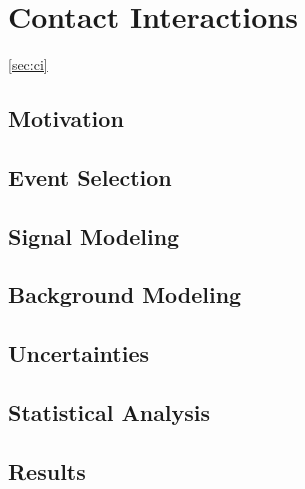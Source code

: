 \chapter{Contact Interactions}\ref{sec:ci}

\section{Motivation}
\section{Event Selection}
\section{Signal Modeling}
\section{Background Modeling}
\section{Uncertainties}
\section{Statistical Analysis}
\section{Results}
